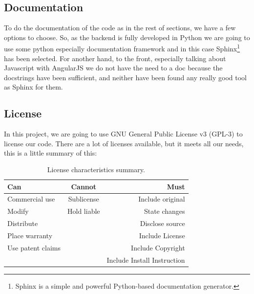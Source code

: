 \subsection{Documentation}

To do the documentation of the code as in the rest of sections, we have a few options
to choose. So, as the backend is fully developed in Python we are going to use some python
especially documentation framework and in this case Sphinx\footnote{Sphinx is a
simple and powerful Python-based documentation generator.} has been selected.
\intro
For another hand, to the front, especially talking about Javascript with AngularJS
we do not have the need to a doc because the docstrings have been sufficient,
and neither have been found any really good tool as Sphinx for them.

\subsection{License}

In this project, we are going to use GNU General Public License v3 (GPL-3)
to license our code.
There are a lot of licenses available, but it meets all our needs,
this is a little summary of this:

\begin{table}[H]
  \centering
  \begin{tabular}{ l | c | r }
    Can &  Cannot & Must \\
    \hline
    Commercial use    & Sublicense    &  Include original \\
    Modify            & Hold liable   &  State changes \\
    Distribute        &               &  Disclose source \\
    Place warranty    &               &  Include License \\
    Use patent claims &               &  Include Copyright \\
                      &               &  Include Install Instruction \\
  \end{tabular}
  \caption{License characteristics summary.}
\end{table}
